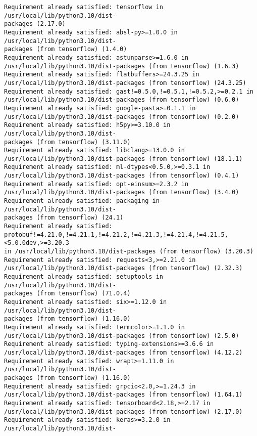 \documentclass[11pt]{article}
\begin{document}
    \begin{Verbatim}[commandchars=\\\{\}]
Requirement already satisfied: tensorflow in /usr/local/lib/python3.10/dist-
packages (2.17.0)
Requirement already satisfied: absl-py>=1.0.0 in /usr/local/lib/python3.10/dist-
packages (from tensorflow) (1.4.0)
Requirement already satisfied: astunparse>=1.6.0 in
/usr/local/lib/python3.10/dist-packages (from tensorflow) (1.6.3)
Requirement already satisfied: flatbuffers>=24.3.25 in
/usr/local/lib/python3.10/dist-packages (from tensorflow) (24.3.25)
Requirement already satisfied: gast!=0.5.0,!=0.5.1,!=0.5.2,>=0.2.1 in
/usr/local/lib/python3.10/dist-packages (from tensorflow) (0.6.0)
Requirement already satisfied: google-pasta>=0.1.1 in
/usr/local/lib/python3.10/dist-packages (from tensorflow) (0.2.0)
Requirement already satisfied: h5py>=3.10.0 in /usr/local/lib/python3.10/dist-
packages (from tensorflow) (3.11.0)
Requirement already satisfied: libclang>=13.0.0 in
/usr/local/lib/python3.10/dist-packages (from tensorflow) (18.1.1)
Requirement already satisfied: ml-dtypes<0.5.0,>=0.3.1 in
/usr/local/lib/python3.10/dist-packages (from tensorflow) (0.4.1)
Requirement already satisfied: opt-einsum>=2.3.2 in
/usr/local/lib/python3.10/dist-packages (from tensorflow) (3.4.0)
Requirement already satisfied: packaging in /usr/local/lib/python3.10/dist-
packages (from tensorflow) (24.1)
Requirement already satisfied:
protobuf!=4.21.0,!=4.21.1,!=4.21.2,!=4.21.3,!=4.21.4,!=4.21.5,<5.0.0dev,>=3.20.3
in /usr/local/lib/python3.10/dist-packages (from tensorflow) (3.20.3)
Requirement already satisfied: requests<3,>=2.21.0 in
/usr/local/lib/python3.10/dist-packages (from tensorflow) (2.32.3)
Requirement already satisfied: setuptools in /usr/local/lib/python3.10/dist-
packages (from tensorflow) (71.0.4)
Requirement already satisfied: six>=1.12.0 in /usr/local/lib/python3.10/dist-
packages (from tensorflow) (1.16.0)
Requirement already satisfied: termcolor>=1.1.0 in
/usr/local/lib/python3.10/dist-packages (from tensorflow) (2.5.0)
Requirement already satisfied: typing-extensions>=3.6.6 in
/usr/local/lib/python3.10/dist-packages (from tensorflow) (4.12.2)
Requirement already satisfied: wrapt>=1.11.0 in /usr/local/lib/python3.10/dist-
packages (from tensorflow) (1.16.0)
Requirement already satisfied: grpcio<2.0,>=1.24.3 in
/usr/local/lib/python3.10/dist-packages (from tensorflow) (1.64.1)
Requirement already satisfied: tensorboard<2.18,>=2.17 in
/usr/local/lib/python3.10/dist-packages (from tensorflow) (2.17.0)
Requirement already satisfied: keras>=3.2.0 in /usr/local/lib/python3.10/dist-

\end{Verbatim}
\end{document}
